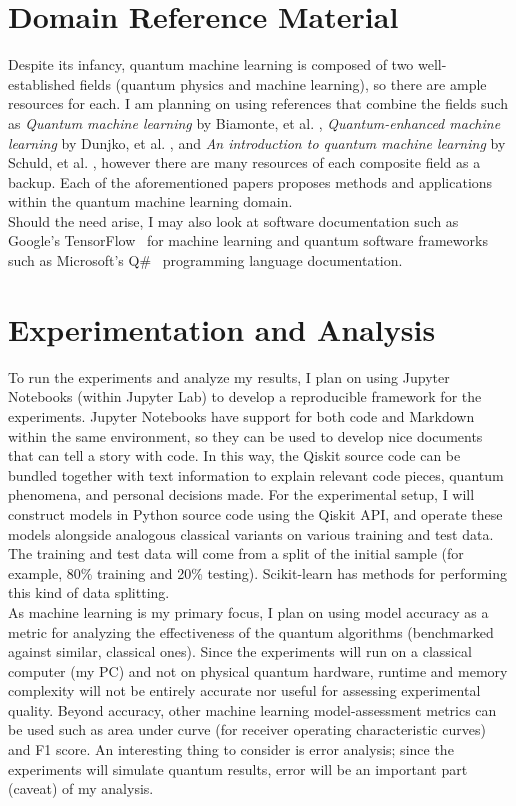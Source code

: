 \documentclass{article}
\begin{document}
\section{Domain Reference Material}
  Despite its infancy, quantum machine learning is composed of two well-established fields (quantum physics and machine learning), so there are ample resources for each. I am planning on using references that combine the fields such as \textit{Quantum machine learning} by Biamonte, et al. \cite{biamonte}, \textit{Quantum-enhanced machine learning} by Dunjko, et al. \cite{dunjko}, and \textit{An introduction to quantum machine learning} by Schuld, et al. \cite{schuld}, however there are many resources of each composite field as a backup. Each of the aforementioned papers proposes methods and applications within the quantum machine learning domain. \\

  Should the need arise, I may also look at software documentation such as Google's TensorFlow~\cite{tensorflow} for machine learning and quantum software frameworks such as Microsoft's Q\#~\cite{msft} programming language documentation.

\section{Experimentation and Analysis}
  To run the experiments and analyze my results, I plan on using Jupyter Notebooks (within Jupyter Lab) to develop a reproducible framework for the experiments. Jupyter Notebooks have support for both code and Markdown within the same environment, so they can be used to develop nice documents that can tell a story with code. In this way, the Qiskit source code can be bundled together with text information to explain relevant code pieces, quantum phenomena, and personal decisions made. For the experimental setup, I will construct models in Python source code using the Qiskit API, and operate these models alongside analogous classical variants on various training and test data. The training and test data will come from a split of the initial sample (for example, 80\% training and 20\% testing). Scikit-learn has methods for performing this kind of data splitting. \\

  As machine learning is my primary focus, I plan on using model accuracy as a metric for analyzing the effectiveness of the quantum algorithms (benchmarked against similar, classical ones). Since the experiments will run on a classical computer (my PC) and not on physical quantum hardware, runtime and memory complexity will not be entirely accurate nor useful for assessing experimental quality. Beyond accuracy, other machine learning model-assessment metrics can be used such as area under curve (for receiver operating characteristic curves) and F1 score. An interesting thing to consider is error analysis; since the experiments will simulate quantum results, error will be an important part (caveat) of my analysis. \\
\end{document}
